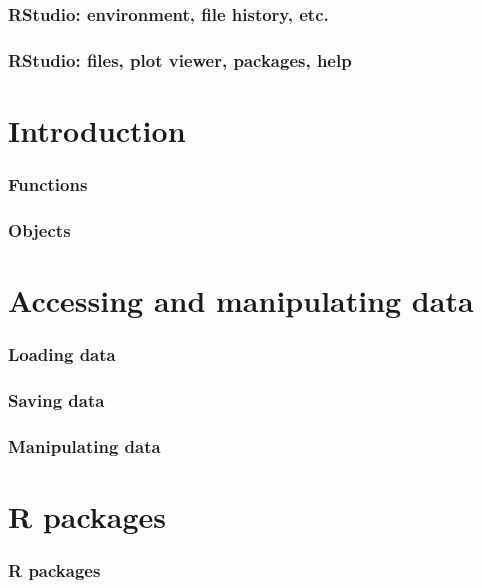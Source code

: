 \documentclass[11pt]{beamer}
\newcommand{\myframe}[1]{\begin{frame} \frametitle{#1}}
\begin{document}
\myframe{RStudio: environment, file history, etc.}

\end{frame}

\myframe{RStudio: files, plot viewer, packages, help}

\end{frame}

\section{Introduction}
\myframe{Functions}

\end{frame}

\myframe{Objects}

\end{frame}

\section{Accessing and manipulating data}
\myframe{Loading data}

\end{frame}

\myframe{Saving data}

\end{frame}

\myframe{Manipulating data}

\end{frame}

\section{R packages}
\myframe{R packages}

\end{frame}
\end{document}
